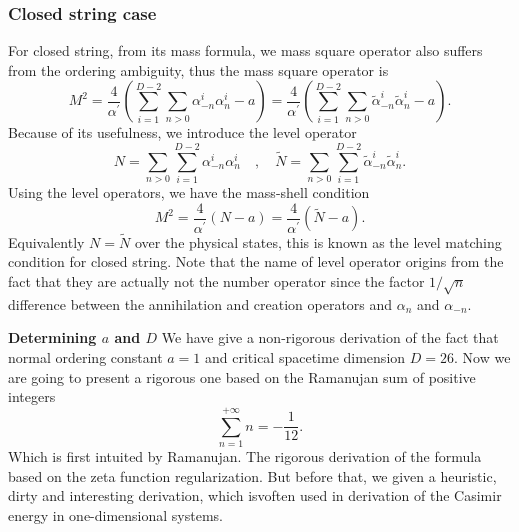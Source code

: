 \documentclass[graybox,envcountchap,sectrefs]{svmono}
\begin{document}
\subsubsection*{Closed string case}
For closed string, from its mass formula, we mass square operator also suffers from the ordering ambiguity, thus the mass square operator is
\begin{equation}
M^{2}=\frac{4}{\alpha^{\prime}}\left(\sum_{i=1}^{D-2} \sum_{n>0} \alpha_{-n}^{i} \alpha_{n}^{i}-a\right)=\frac{4}{\alpha^{\prime}}\left(\sum_{i=1}^{D-2} \sum_{n>0} \tilde{\alpha}_{-n}^{i} \tilde{\alpha}_{n}^{i}-a\right).
\end{equation}
Because of its usefulness, we introduce the level operator
\begin{equation}
N=\sum_{n>0} \sum_{i=1}^{D-2} \alpha_{-n}^{i} \alpha_{n}^{i} \quad, \quad \tilde{N}= \sum_{n>0} \sum_{i=1}^{D-2}\tilde{\alpha}_{-n}^{i} \tilde{\alpha}_{n}^{i}.
\end{equation}
Using the level operators, we have the mass-shell condition
\begin{equation}
M^{2}=\frac{4}{\alpha^{\prime}}(N-a)=\frac{4}{\alpha^{\prime}}(\tilde{N}-a).
\end{equation}
Equivalently $N=\tilde{N}$ over the physical states, this is known as the level matching condition for closed string.
Note that the name of level operator origins from the fact that they are actually  not the number operator since the factor $1/\sqrt{n}$ difference between the annihilation and creation operators and $\alpha_n$ and $\alpha_{-n}$.

\textbf{Determining $a$ and $D$} \textemdash We have give a non-rigorous derivation of the fact that normal ordering constant $a=1$ and critical spacetime dimension $D=26$. Now we are going to present a rigorous one based on the Ramanujan sum of positive integers
$$\sum_{n=1}^{+\infty}n=-\frac{1}{12}.$$ 
Which is first intuited by Ramanujan. The rigorous derivation of the formula based on the zeta function regularization. 
But before that, we given a heuristic, dirty and interesting derivation, which isvoften used in derivation of the Casimir energy in one-dimensional systems.
\end{document}
